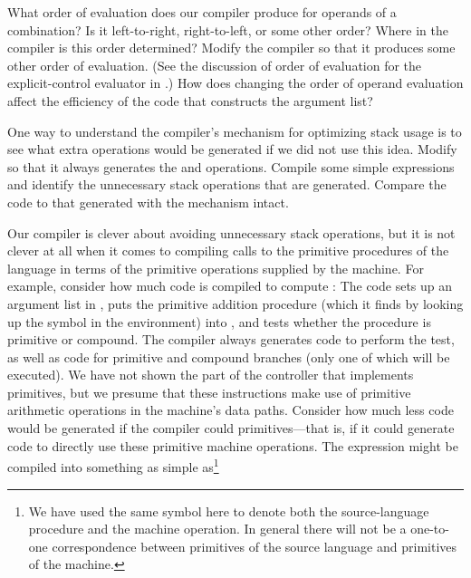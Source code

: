\begin{exerciseGroup}
\label{Exercise 5.36}
 What order of evaluation does our
compiler produce for operands of a combination?  Is it left-to-right,
right-to-left, or some other order?  Where in the compiler is this order
determined?  Modify the compiler so that it produces some other order of
evaluation.  (See the discussion of order of evaluation for the
explicit-control evaluator in .)  How does changing the
order of operand evaluation affect the efficiency of the code that constructs
the argument list?

\label{Exercise 5.37}
 One way to understand the
compiler's  mechanism for optimizing stack usage is to see
what extra operations would be generated if we did not use this idea.  Modify
 so that it always generates the  and
 operations.  Compile some simple expressions and identify the
unnecessary stack operations that are generated.  Compare the code to that
generated with the  mechanism intact.

\label{Exercise 5.38}
 Our compiler is clever about
avoiding unnecessary stack operations, but it is not clever at all when it
comes to compiling calls to the primitive procedures of the language in terms
of the primitive operations supplied by the machine.  For example, consider how
much code is compiled to compute : The code sets up an argument
list in , puts the primitive addition procedure (which it finds by
looking up the symbol \code{+} in the environment) into , and tests
whether the procedure is primitive or compound.  The compiler always generates
code to perform the test, as well as code for primitive and compound branches
(only one of which will be executed).  We have not shown the part of the
controller that implements primitives, but we presume that these instructions
make use of primitive arithmetic operations in the machine's data paths.
Consider how much less code would be generated if the compiler could
 primitives---that is, if it could generate code to directly
use these primitive machine operations.  The expression  might be
compiled into something as simple as\footnote{We have used the same symbol
\code{+} here to denote both the source-language procedure and the machine
operation.  In general there will not be a one-to-one correspondence between
primitives of the source language and primitives of the machine.}


\end{exerciseGroup}
